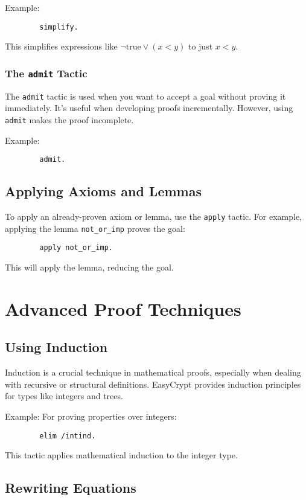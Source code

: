 \documentclass{article}
\begin{document}
	Example:
	\begin{verbatim}
		simplify.
	\end{verbatim}
	This simplifies expressions like \( \neg \text{true} \lor (x < y) \) to just \( x < y \).
	
	\subsubsection{The \texttt{admit} Tactic}
	The \texttt{admit} tactic is used when you want to accept a goal without proving it immediately. It's useful when developing proofs incrementally. However, using \texttt{admit} makes the proof incomplete.
	
	Example:
	\begin{verbatim}
		admit.
	\end{verbatim}
	
	\subsection{Applying Axioms and Lemmas}
	To apply an already-proven axiom or lemma, use the \texttt{apply} tactic. For example, applying the lemma \texttt{not\_or\_imp} proves the goal:
	\begin{verbatim}
		apply not_or_imp.
	\end{verbatim}
	This will apply the lemma, reducing the goal.
	
	\section{Advanced Proof Techniques}
	
	\subsection{Using Induction}
	
	Induction is a crucial technique in mathematical proofs, especially when dealing with recursive or structural definitions. EasyCrypt provides induction principles for types like integers and trees.
	
	Example: For proving properties over integers:
	\begin{verbatim}
		elim /intind.
	\end{verbatim}
	This tactic applies mathematical induction to the integer type.
	
	\subsection{Rewriting Equations}
	
\end{document}
